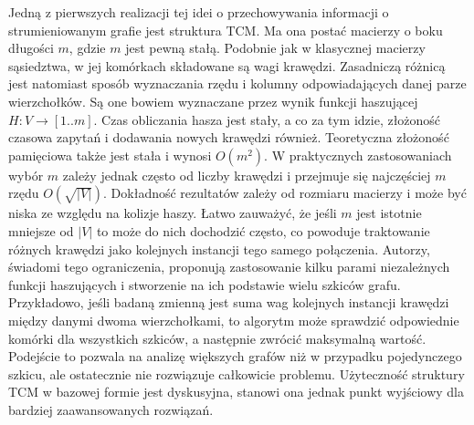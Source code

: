     Jedną z pierwszych realizacji tej idei o przechowywania informacji o strumieniowanym grafie jest struktura TCM\cite{Tang_Chen_Mitra_2016}. Ma ona postać macierzy o boku długości $m$, gdzie $m$ jest pewną stałą. Podobnie jak w klasycznej macierzy sąsiedztwa, w jej komórkach składowane są wagi krawędzi. Zasadniczą różnicą jest natomiast sposób wyznaczania rzędu i kolumny odpowiadających danej parze wierzchołków. Są one bowiem wyznaczane przez wynik funkcji haszującej $H : V \rightarrow [1..m]$. Czas obliczania hasza jest stały, a co za tym idzie, złożoność czasowa zapytań i dodawania nowych krawędzi również. Teoretyczna złożoność pamięciowa także jest stała i wynosi $O(m^2)$. W praktycznych zastosowaniach wybór $m$ zależy jednak często od liczby krawędzi i przejmuje się najczęściej $m$ rzędu $O(\sqrt{|V|})$. Dokładność rezultatów zależy od rozmiaru macierzy i może być niska ze względu na kolizje haszy. Łatwo zauważyć, że jeśli $m$ jest istotnie mniejsze od $|V|$ to może do nich dochodzić często, co powoduje traktowanie różnych krawędzi jako kolejnych instancji tego samego połączenia. Autorzy, świadomi tego ograniczenia, proponują zastosowanie kilku parami niezależnych funkcji haszujących i stworzenie na ich podstawie wielu szkiców grafu. Przykładowo, jeśli badaną zmienną jest suma wag kolejnych instancji krawędzi między danymi dwoma wierzchołkami, to algorytm może sprawdzić odpowiednie komórki dla wszystkich szkiców, a następnie zwrócić maksymalną wartość. Podejście to pozwala na analizę większych grafów niż w przypadku pojedynczego szkicu, ale ostatecznie nie rozwiązuje całkowicie problemu. Użyteczność struktury TCM w bazowej formie jest dyskusyjna, stanowi ona jednak punkt wyjściowy dla bardziej zaawansowanych rozwiązań.

